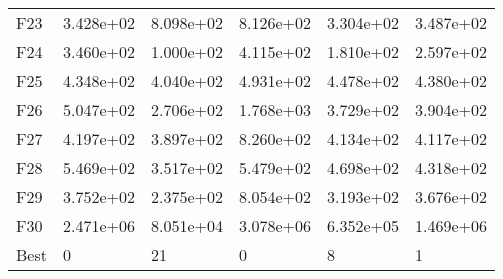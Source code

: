 \begin{tabular}{llllll}
F23  &  3.428e+02 &  8.098e+02 &  8.126e+02 &  3.304e+02 &  3.487e+02 \\
F24  &  3.460e+02 &  1.000e+02 &  4.115e+02 &  1.810e+02 &  2.597e+02 \\
F25  &  4.348e+02 &  4.040e+02 &  4.931e+02 &  4.478e+02 &  4.380e+02 \\
F26  &  5.047e+02 &  2.706e+02 &  1.768e+03 &  3.729e+02 &  3.904e+02 \\
F27  &  4.197e+02 &  3.897e+02 &  8.260e+02 &  4.134e+02 &  4.117e+02 \\
F28  &  5.469e+02 &  3.517e+02 &  5.479e+02 &  4.698e+02 &  4.318e+02 \\
F29  &  3.752e+02 &  2.375e+02 &  8.054e+02 &  3.193e+02 &  3.676e+02 \\
F30  &  2.471e+06 &  8.051e+04 &  3.078e+06 &  6.352e+05 &  1.469e+06 \\
Best &          0 &         21 &          0 &          8 &          1 \\
\bottomrule
\end{tabular}
